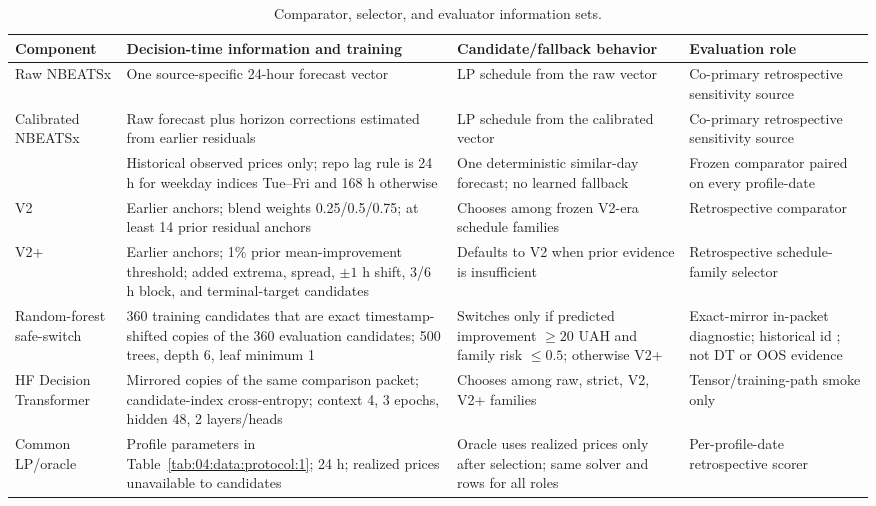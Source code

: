 \begin{table}[t]
\centering
\caption{Comparator, selector, and evaluator information sets.}
\label{tab:04:data:protocol:2}
\small
\begin{tabularx}{\textwidth}{@{}YYYY@{}}
\toprule
Component & Decision-time information and training & Candidate/fallback behavior & Evaluation role \\
\midrule
Raw NBEATSx & One source-specific 24-hour forecast vector & LP schedule from the raw vector & Co-primary retrospective sensitivity source \\
Calibrated NBEATSx & Raw forecast plus horizon corrections estimated from earlier residuals & LP schedule from the calibrated vector & Co-primary retrospective sensitivity source \\
 & Historical observed prices only; repo lag rule is 24 h for weekday indices Tue--Fri and 168 h otherwise & One deterministic similar-day forecast; no learned fallback & Frozen comparator paired on every profile-date \\
V2 & Earlier anchors; blend weights 0.25/0.5/0.75; at least 14 prior residual anchors & Chooses among frozen V2-era schedule families & Retrospective comparator \\
V2+ & Earlier anchors; 1\% prior mean-improvement threshold; added extrema, spread, $\pm 1$ h shift, 3/6 h block, and terminal-target candidates & Defaults to V2 when prior evidence is insufficient & Retrospective schedule-family selector \\
Random-forest safe-switch & 360 training candidates that are exact timestamp-shifted copies of the 360 evaluation candidates; 500 trees, depth 6, leaf minimum 1 & Switches only if predicted improvement $\geq 20$ UAH and family risk $\leq 0.5$; otherwise V2+ & Exact-mirror in-packet diagnostic; historical id ; not DT or OOS evidence \\
HF Decision Transformer & Mirrored copies of the same comparison packet; candidate-index cross-entropy; context 4, 3 epochs, hidden 48, 2 layers/heads & Chooses among raw, strict, V2, V2+ families & Tensor/training-path smoke only \\
Common LP/oracle & Profile parameters in Table~\ref{tab:04:data:protocol:1}; 24 h; realized prices unavailable to candidates & Oracle uses realized prices only after selection; same solver and rows for all roles & Per-profile-date retrospective scorer \\
\bottomrule
\end{tabularx}
\end{table}

